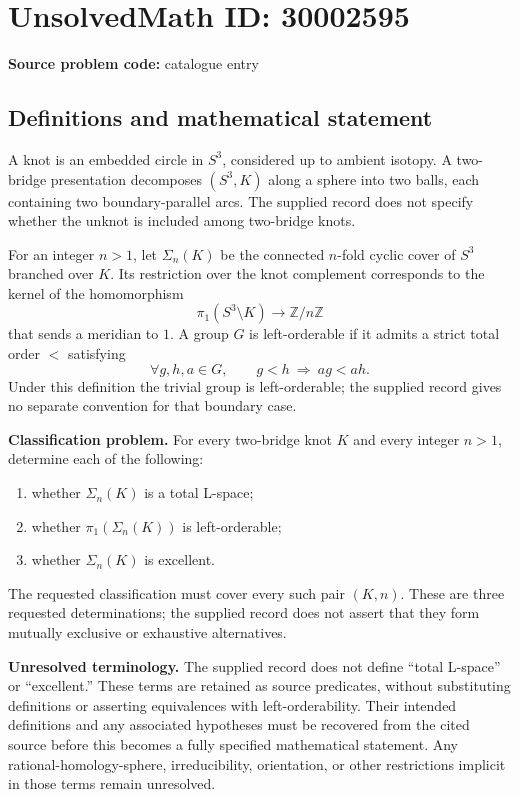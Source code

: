 \documentclass[11pt]{article}
\newcommand{\Z}{\mathbb{Z}}
\begin{document}
\section*{UnsolvedMath ID: 30002595}
\textbf{Source problem code:} catalogue entry
\subsection{Definitions and mathematical statement}
A knot is an embedded circle in \(S^3\), considered up to ambient isotopy. A two-bridge presentation decomposes \((S^3,K)\) along a sphere into two balls, each containing two boundary-parallel arcs. The supplied record does not specify whether the unknot is included among two-bridge knots.

For an integer \(n>1\), let \(\Sigma_n(K)\) be the connected \(n\)-fold cyclic cover of \(S^3\) branched over \(K\). Its restriction over the knot complement corresponds to the kernel of the homomorphism
\[
\pi_1(S^3\setminus K)\longrightarrow \Z/n\Z
\]
that sends a meridian to \(1\). A group \(G\) is left-orderable if it admits a strict total order \(<\) satisfying
\[
\forall g,h,a\in G,\qquad g<h\ \Longrightarrow\ ag<ah.
\]
Under this definition the trivial group is left-orderable; the supplied record gives no separate convention for that boundary case.

\textbf{Classification problem.} For every two-bridge knot \(K\) and every integer \(n>1\), determine each of the following:
\begin{enumerate}
\item whether \(\Sigma_n(K)\) is a total L-space;
\item whether \(\pi_1(\Sigma_n(K))\) is left-orderable;
\item whether \(\Sigma_n(K)\) is excellent.
\end{enumerate}
The requested classification must cover every such pair \((K,n)\). These are three requested determinations; the supplied record does not assert that they form mutually exclusive or exhaustive alternatives.

\textbf{Unresolved terminology.} The supplied record does not define ``total L-space'' or ``excellent.'' These terms are retained as source predicates, without substituting definitions or asserting equivalences with left-orderability. Their intended definitions and any associated hypotheses must be recovered from the cited source before this becomes a fully specified mathematical statement. Any rational-homology-sphere, irreducibility, orientation, or other restrictions implicit in those terms remain unresolved.
\end{document}

